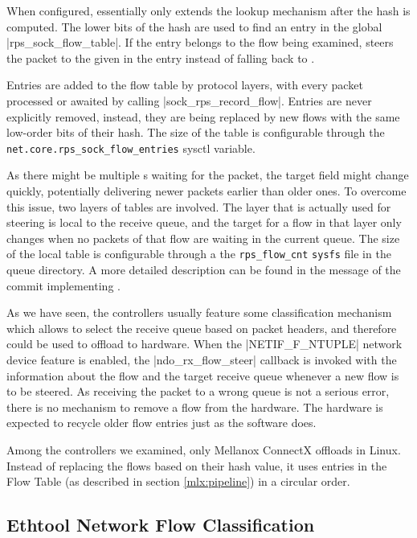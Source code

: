 When configured,  essentially only extends the lookup mechanism after
the  hash is computed. The lower bits of the hash are used to find an
entry in the global \struct|rps_sock_flow_table|. If the entry belongs to the flow
being examined,  steers the packet to the  given in the entry
instead of falling back to .

Entries are added to the flow table by protocol layers, with every packet
processed or awaited by calling \fnc|sock_rps_record_flow|.
Entries are never explicitly removed, instead, they are being replaced by new
flows with the same low-order bits of their hash. The size of the table is
configurable through the \Verb|net.core.rps_sock_flow_entries| sysctl variable.

As there might be multiple s waiting for the packet, the target 
field might change quickly, potentially delivering newer packets earlier than
older ones. To overcome this issue, two layers of tables are involved. The layer
that is actually used for steering is local to the receive queue, and the
target  for a flow in that layer only changes when no packets of that flow are
waiting in the current  queue. The size of the local table is
configurable through a the \Verb|rps_flow_cnt| \texttt{sysfs} file in the queue
directory. A more detailed description can be found in the message of the commit
implementing  \cite{linux-rfs}.

As we have seen, the controllers usually feature some classification mechanism
which allows to select the receive queue based on packet headers, and therefore could be
used to offload  to hardware. When the \macro|NETIF_F_NTUPLE| network device feature
is enabled, the \fnc|ndo_rx_flow_steer| callback is invoked with the information
about the flow and the target receive queue whenever a new flow is to be steered.
As receiving the packet to a wrong queue is not a serious error, there is no mechanism to
remove a flow from the hardware. The hardware is expected to recycle older flow
entries just as the software does.

Among the controllers we examined, only Mellanox ConnectX offloads  in
Linux. Instead of replacing the flows based on their hash value, it uses entries in
the Flow Table (as described in section \ref{mlx:pipeline}) in a circular order.

\subsection{Ethtool Network Flow Classification}

